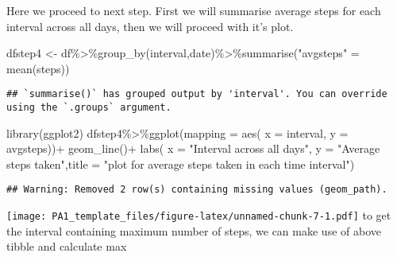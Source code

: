 \documentclass[
]{article}
\newenvironment{Shaded}{\begin{snugshade}}{\end{snugshade}}
\newcommand{\AttributeTok}[1]{\textcolor[rgb]{0.77,0.63,0.00}{#1}}
\newcommand{\FunctionTok}[1]{\textcolor[rgb]{0.00,0.00,0.00}{#1}}
\newcommand{\NormalTok}[1]{#1}
\newcommand{\OtherTok}[1]{\textcolor[rgb]{0.56,0.35,0.01}{#1}}
\newcommand{\SpecialCharTok}[1]{\textcolor[rgb]{0.00,0.00,0.00}{#1}}
\newcommand{\StringTok}[1]{\textcolor[rgb]{0.31,0.60,0.02}{#1}}
\begin{document}
Here we proceed to next step. First we will summarise average steps for
each interval across all days, then we will proceed with it's plot.

\begin{Shaded}
\begin{Highlighting}[]
\NormalTok{dfstep4 }\OtherTok{\textless{}{-}}\NormalTok{ df}\SpecialCharTok{\%\textgreater{}\%}\FunctionTok{group\_by}\NormalTok{(interval,date)}\SpecialCharTok{\%\textgreater{}\%}\FunctionTok{summarise}\NormalTok{(}\StringTok{"avgsteps"} \OtherTok{=} \FunctionTok{mean}\NormalTok{(steps))}
\end{Highlighting}
\end{Shaded}

\begin{verbatim}
## `summarise()` has grouped output by 'interval'. You can override using the `.groups` argument.
\end{verbatim}

\begin{Shaded}
\begin{Highlighting}[]
\FunctionTok{library}\NormalTok{(ggplot2)}
\NormalTok{dfstep4}\SpecialCharTok{\%\textgreater{}\%}\FunctionTok{ggplot}\NormalTok{(}\AttributeTok{mapping =} \FunctionTok{aes}\NormalTok{( }\AttributeTok{x =}\NormalTok{ interval,  }\AttributeTok{y =}\NormalTok{ avgsteps))}\SpecialCharTok{+}
  \FunctionTok{geom\_line}\NormalTok{()}\SpecialCharTok{+}
  \FunctionTok{labs}\NormalTok{( }\AttributeTok{x =} \StringTok{"Interval across all days"}\NormalTok{, }\AttributeTok{y =} \StringTok{"Average steps taken"}\NormalTok{,}\AttributeTok{title =}       \StringTok{"plot for average steps taken in each time interval"}\NormalTok{)}
\end{Highlighting}
\end{Shaded}

\begin{verbatim}
## Warning: Removed 2 row(s) containing missing values (geom_path).
\end{verbatim}

\texttt{[image: PA1\_template\_files/figure-latex/unnamed-chunk-7-1.pdf]}
to get the interval containing maximum number of steps, we can make use
of above tibble and calculate max

\begin{Shaded}
\end{Shaded}
\end{document}
